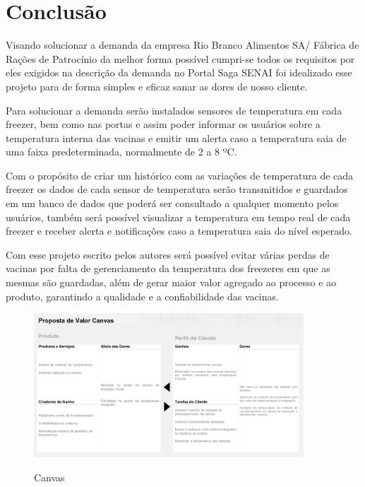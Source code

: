 \chapter{Conclusão}

    Visando solucionar a demanda da empresa
    Rio Branco Alimentos SA/ Fábrica de Rações de Patrocínio
    da melhor forma possível cumpri-se todos os requisitos 
    por eles exigidos na descrição da demanda no Portal Saga SENAI
    foi idealizado esse projeto para de forma simples e eficaz 
    sanar as dores de nosso cliente.

    Para solucionar a demanda serão instalados sensores de 
    temperatura em cada freezer, bem como nas portas
    e assim poder informar os usuários sobre a temperatura
    interna das vacinas e emitir um alerta caso a temperatura
    saia de uma faixa predeterminada, normalmente de 2 a 8 ºC.

    Com o propósito de criar um histórico com as variações de 
    temperatura de cada freezer os dados de cada sensor de 
    temperatura serão transmitidos e guardados em um 
    banco de dados que poderá ser consultado a qualquer momento
    pelos usuários, também será possível visualizar a temperatura
    em tempo real de cada freezer e receber alerta e notificações
    caso a temperatura saia do nível esperado.

    Com esse projeto escrito pelos autores 
    será possível evitar várias perdas de vacinas por 
    falta de gerenciamento da temperatura dos freezeres
    em que as mesmas são guardadas, além de gerar maior valor 
    agregado ao processo e ao produto, garantindo 
    a qualidade e a confiabilidade das vacinas.

    \begin{figure}
        \caption{Canvas}
        \centering
        \includegraphics[width=0.9\textwidth]{img/canvas.png}
        \label{fig:canvas}
    \end{figure}
